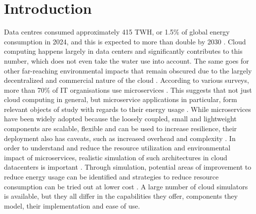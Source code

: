 \section{Introduction}\label{s:intro}
Data centres consumed approximately 415 TWH, or 1.5\% of global energy consumption in 2024, and this is expected to more than double by 2030 \cite{iea_energy_2025}.
Cloud computing happens largely in data centers and significantly contributes to this number, which does not even take the water use \cite{siddik_environmental_2021} into account. The same goes for other far-reaching environmental impacts that remain obscured due to the largely decentralized and commercial nature of the cloud \cite{Monserrate2022Cloud}. According to various surveys, more than 70\% of IT organisations use microservices \cite{statista_global_2021, gartner_peer_community_microservices_2023, loukides_microservices_2020}.
This suggests that not just cloud computing in general, but microservice applications in particular, form relevant objects of study with regards to their energy usage \cite{araujo_energy_2024}. While microservices have been widely adopted because the loosely coupled, small and lightweight components are scalable, flexible and can be used to increase resilience, their deployment also has caveats, such as increased overhead and complexity \cite{pirhonen_pains_2025}. In order to understand and reduce the resource utilization and environmental impact of microservices, realistic simulation of such architectures in cloud datacenters is important \cite{katal_energy_2023}. Through simulation, potential areas of improvement to reduce energy usage can be identified and strategies to reduce resource consumption can be tried out at lower cost \cite{mansouri_cloud_2020}. A large number of cloud simulators is available, but they all differ in the capabilities they offer, components they model, their implementation and ease of use.

